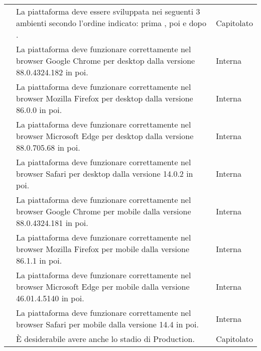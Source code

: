 \begin{longtable}{c C{9.5cm} C{2.5cm}}
	 & La piattaforma deve essere sviluppata nei seguenti 3 ambienti secondo l'ordine indicato: prima , poi  e dopo . & Capitolato \\

	 & La piattaforma deve funzionare correttamente nel browser Google Chrome per desktop dalla versione 88.0.4324.182 in poi. & Interna \\

	 & La piattaforma deve funzionare correttamente nel browser Mozilla Firefox per desktop dalla versione 86.0.0 in poi. & Interna \\

	 & La piattaforma deve funzionare correttamente nel browser Microsoft Edge per desktop dalla versione 88.0.705.68 in poi. & Interna \\

	 & La piattaforma deve funzionare correttamente nel browser Safari per desktop dalla versione 14.0.2 in poi. & Interna \\

	 & La piattaforma deve funzionare correttamente nel browser Google Chrome per mobile dalla versione 88.0.4324.181 in poi. & Interna \\

	 & La piattaforma deve funzionare correttamente nel browser Mozilla Firefox per mobile dalla versione 86.1.1 in poi. & Interna \\

	 & La piattaforma deve funzionare correttamente nel browser Microsoft Edge per mobile dalla versione 46.01.4.5140 in poi. & Interna \\

	 & La piattaforma deve funzionare correttamente nel browser Safari per mobile dalla versione 14.4 in poi. & Interna \\
	
	 & È desiderabile avere anche lo stadio di Production. & Capitolato \\
	
\end{longtable}
